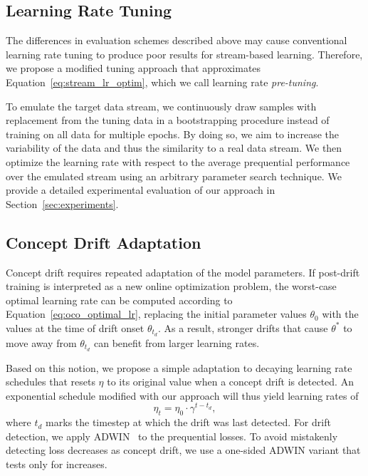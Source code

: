 \documentclass{article} %
\begin{document}
\subsection{Learning Rate Tuning}\label{subsec:pre-tuning}

The differences in evaluation schemes described above may cause conventional learning rate tuning to produce poor results for stream-based learning.
Therefore, we propose a modified tuning approach that approximates Equation~\eqref{eq:stream_lr_optim}, which we call learning rate \textit{pre-tuning}.

To emulate the target data stream, we continuously draw samples with replacement from the tuning data in a bootstrapping procedure instead of training on all data for multiple epochs.
By doing so, we aim to increase the variability of the data and thus the similarity to a real data stream.
We then optimize the learning rate with respect to the average prequential performance over the emulated stream using an arbitrary parameter search technique.
We provide a detailed experimental evaluation of our approach in Section~\ref{sec:experiments}.

\subsection{Concept Drift Adaptation}

Concept drift requires repeated adaptation of the model parameters.
If post-drift training is interpreted as a new online optimization problem, the worst-case optimal learning rate can be computed according to Equation~\eqref{eq:oco_optimal_lr}, replacing the initial parameter values $\theta_0$ with the values at the time of drift onset $\theta_{t_d}$.
As a result, stronger drifts that cause $\theta^*$ to move away from $\theta_{t_d}$ can benefit from larger learning rates.

Based on this notion, we propose a simple adaptation to decaying learning rate schedules that resets $\eta$ to its original value when a concept drift is detected.
An exponential schedule modified with our approach will thus yield learning rates of
\begin{equation}
   \eta_t = \eta_0 \cdot \gamma^{t-t_d},
\end{equation}\label{eq:drift_reset}
where $t_d$ marks the timestep at which the drift was last detected.
For drift detection, we apply ADWIN~\citep{bifetLearningTimeChangingData2007} to the prequential losses.
To avoid mistakenly detecting loss decreases as concept drift, we use a one-sided ADWIN variant that tests only for increases.
\end{document}
